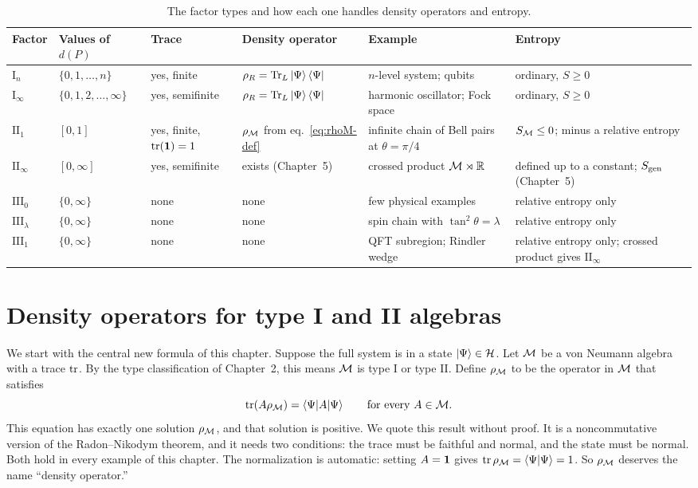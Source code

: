 \begin{table}[htbp]
\centering
\footnotesize
\begin{tabularx}{\textwidth}{@{}l >{\raggedright\arraybackslash}p{2.3cm} >{\raggedright\arraybackslash}p{1.9cm}
>{\raggedright\arraybackslash}p{2.4cm} >{\raggedright\arraybackslash}X >{\raggedright\arraybackslash}p{2.7cm}@{}}
\toprule
\textbf{Factor} & \textbf{Values of $d(P)$} & \textbf{Trace} & \textbf{Density operator} &
\textbf{Example} & \textbf{Entropy} \\
\midrule
$\mathrm{I}_n$ & $\{0, 1, \dots, n\}$ & yes, finite & $\rho_R = \operatorname{Tr}_L\ket\Psi\bra\Psi$ &
$n$-level system; qubits & ordinary, $S \ge 0$ \\
$\mathrm{I}_\infty$ & $\{0, 1, 2, \dots, \infty\}$ & yes, semifinite & $\rho_R = \operatorname{Tr}_L\ket\Psi\bra\Psi$ &
harmonic oscillator; Fock space & ordinary, $S \ge 0$ \\
$\mathrm{II}_1$ & $[0, 1]$ & yes, finite, $\operatorname{tr}(\mathbf{1})=1$ & $\rho_{\mathcal{M}}$ from eq.~\eqref{eq:rhoM-def} &
infinite chain of Bell pairs at $\theta=\pi/4$ & $S_{\mathcal{M}} \le 0$; minus a relative entropy \\
$\mathrm{II}_\infty$ & $[0, \infty]$ & yes, semifinite & exists (Chapter~5) &
crossed product $\mathcal{M} \rtimes \mathbb{R}$ & defined up to a constant; $S_{\rm gen}$ (Chapter~5) \\
$\mathrm{III}_0$ & $\{0, \infty\}$ & none & none & few physical examples & relative entropy only \\
$\mathrm{III}_\lambda$ & $\{0, \infty\}$ & none & none & spin chain with $\tan^2\theta = \lambda$ &
relative entropy only \\
$\mathrm{III}_1$ & $\{0, \infty\}$ & none & none & QFT subregion; Rindler wedge &
relative entropy only; crossed product gives $\mathrm{II}_\infty$ \\
\bottomrule
\end{tabularx}
\caption{The factor types and how each one handles density operators and entropy.}
\label{tab:factor_taxonomy}
\end{table}

\section{Density operators for type I and II algebras}

We start with the central new formula of this chapter. Suppose the full system is in a state
$\ket\Psi\in\mathcal{H}$. Let $\mathcal{M}$ be a von Neumann algebra with a trace $\operatorname{tr}$. By the type classification of
Chapter~2, this means $\mathcal{M}$ is type I or type II. Define $\rho_{\mathcal{M}}$ to be the operator in $\mathcal{M}$ that satisfies
\begin{equation}
\operatorname{tr}(A\rho_{\mathcal{M}}) = \braket{\Psi|A|\Psi} \qquad \text{for every } A\in\mathcal{M} .
\label{eq:rhoM-def}
\end{equation}
This equation has exactly one solution $\rho_{\mathcal{M}}$, and that solution is positive. We quote this result without
proof. It is a noncommutative version of the Radon--Nikodym theorem, and it needs two conditions: the trace must
be faithful and normal, and the state must be normal. Both hold in every example of this chapter. The
normalization is automatic: setting $A=\mathbf{1}$ gives $\operatorname{tr}\rho_{\mathcal{M}}=\braket{\Psi|\Psi}=1$. So $\rho_{\mathcal{M}}$ deserves
the name ``density operator.''

